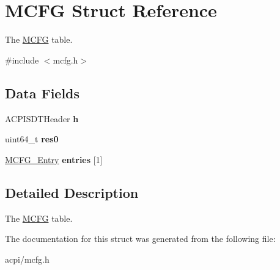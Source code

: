 \hypertarget{structMCFG}{}\section{M\+C\+FG Struct Reference}
\label{structMCFG}


The \hyperlink{structMCFG}{M\+C\+FG} table.  




{\ttfamily \#include $<$mcfg.\+h$>$}

\subsection*{Data Fields}
\begin{DoxyCompactItemize}
\item 
A\+C\+P\+I\+S\+D\+T\+Header {\bfseries h}\hypertarget{structMCFG_a7a0624914faf12974541c5dd47f2fa18}{}\label{structMCFG_a7a0624914faf12974541c5dd47f2fa18}

\item 
uint64\+\_\+t {\bfseries res0}\hypertarget{structMCFG_a429301be0c6b9cfbd2fdd49b4538479f}{}\label{structMCFG_a429301be0c6b9cfbd2fdd49b4538479f}

\item 
\hyperlink{structMCFG__Entry}{M\+C\+F\+G\+\_\+\+Entry} {\bfseries entries} \mbox{[}1\mbox{]}\hypertarget{structMCFG_a0808b343611a047779c0bc2846826301}{}\label{structMCFG_a0808b343611a047779c0bc2846826301}

\end{DoxyCompactItemize}


\subsection{Detailed Description}
The \hyperlink{structMCFG}{M\+C\+FG} table. 

The documentation for this struct was generated from the following file\+:\begin{DoxyCompactItemize}
\item 
acpi/mcfg.\+h\end{DoxyCompactItemize}
